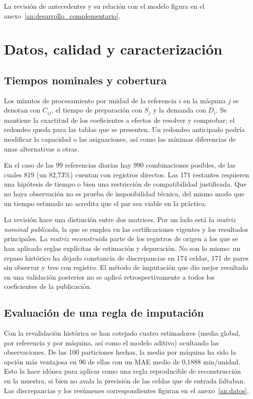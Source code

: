 \documentclass[12pt,a4paper,oneside]{article}
\begin{document}
La revisión de antecedentes y su relación con el modelo figura en el anexo~\ref{an:desarrollo_complementario}.

\section{Datos, calidad y caracterización}\label{sec:datos}
\subsection{Tiempos nominales y cobertura}
Los minutos de procesamiento por unidad de la referencia $i$ en la máquina $j$ se denotan con $C_{ij}$, el tiempo de preparación con $S_j$ y la demanda con $D_i$. Se mantiene la exactitud de los coeficientes a efectos de resolver y comprobar; el redondeo queda para las tablas que se presenten. Un redondeo anticipado podría modificar la capacidad o las asignaciones, así como las mínimas diferencias de unas alternativas a otras.

En el caso de las 99 referencias diarias hay 990 combinaciones posibles, de las cuales 819 (un 82,73\%) cuentan con registros directos. Las 171 restantes requieren una hipótesis de tiempo o bien una restricción de compatibilidad justificada. Que no haya observación no es prueba de imposibilidad técnica, del mismo modo que un tiempo estimado no acredita que el par sea viable en la práctica.

La revisión hace una distinción entre dos matrices. Por un lado está la \textit{matriz nominal publicada}, la que se emplea en las certificaciones vigentes y los resultados principales. La \textit{matriz reconstruida} parte de los registros de origen a los que se han aplicado reglas explícitas de estimación y depuración. No son lo mismo: un repaso histórico ha dejado constancia de discrepancias en 174 celdas, 171 de pares sin observar y tres con registro. El método de imputación que dio mejor resultado en una validación posterior no se aplicó retrospectivamente a todos los coeficientes de la publicación.

\subsection{Evaluación de una regla de imputación}
Con la revalidación histórica se han cotejado cuatro estimadores (media global, por referencia y por máquina, así como el modelo aditivo) ocultando las observaciones. De las 100 particiones hechas, la media por máquina ha sido la opción más ventajosa en 96 de ellas con un MAE medio de 0,1888 min/unidad. Esto la hace idónea para aplicar como una regla reproducible de reconstrucción en la muestra, si bien no avala la precisión de las celdas que de entrada faltaban. Las discrepancias y los resúmenes correspondientes figuran en el anexo~\ref{an:datos}.
\end{document}
